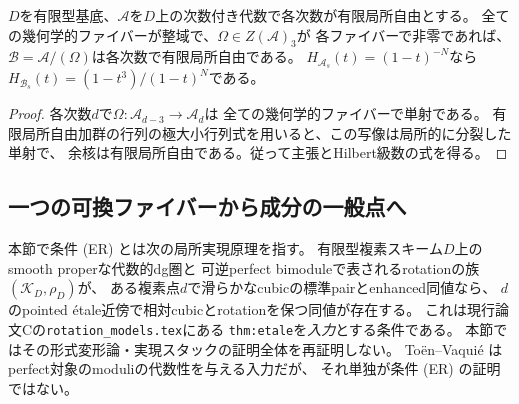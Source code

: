 \begin{lemma}[正則中心商の次数別flatness]
\label{cw:lem:flat-quotient}
$D$を有限型基底、$\mathcal A$を$D$上の次数付き代数で各次数が有限局所自由とする。
全ての幾何学的ファイバーが整域で、$\Omega\in Z(\mathcal A)_3$が
各ファイバーで非零であれば、$\mathcal B=\mathcal A/(\Omega)$は各次数で有限局所自由である。
$H_{\mathcal A_s}(t)=(1-t)^{-N}$なら
$H_{\mathcal B_s}(t)=(1-t^3)/(1-t)^N$である。
\end{lemma}
\begin{proof}
各次数$d$で$\Omega:\mathcal A_{d-3}\to\mathcal A_d$は
全ての幾何学的ファイバーで単射である。
有限局所自由加群の行列の極大小行列式を用いると、この写像は局所的に分裂した単射で、
余核は有限局所自由である。従って主張とHilbert級数の式を得る。
\end{proof}

\subsection{一つの可換ファイバーから成分の一般点へ}

\begin{definition}[条件 (ER)]
\label{cw:def:ER}
本節で条件 (ER) とは次の局所実現原理を指す。
有限型複素スキーム$D$上のsmooth properな代数的dg圏と
可逆perfect bimoduleで表されるrotationの族$(\mathcal K_D,\rho_D)$が、
ある複素点$d$で滑らかなcubicの標準pairとenhanced同値なら、
$d$のpointed étale近傍で相対cubicとrotationを保つ同値が存在する。
これは現行論文Cの\texttt{rotation\_models.tex}にある
\texttt{thm:etale}を\emph{入力}とする条件である。
本節ではその形式変形論・実現スタックの証明全体を再証明しない。
Toën--Vaquié \cite[Theorem 3.6]{TV} はperfect対象のmoduliの代数性を与える入力だが、
それ単独が条件 (ER) の証明ではない。
\end{definition}

